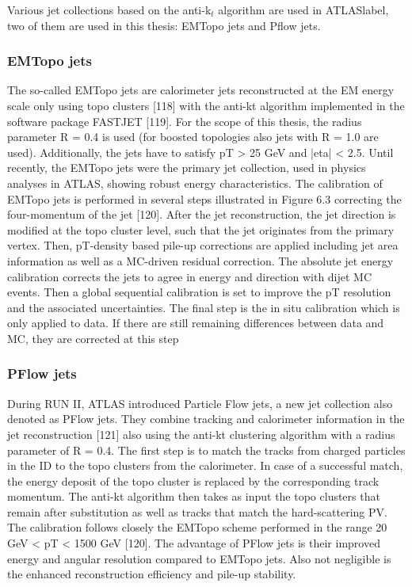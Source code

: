 Various jet collections based on the anti-k$_t$ algorithm are used in \acrshort{ATLASlabel}, two of them are used in this thesis: EMTopo jets and Pflow jets.

\subsubsection{EMTopo jets}

The so-called EMTopo jets are calorimeter jets reconstructed at the EM energy scale only using topo
clusters [118] with the anti-kt algorithm implemented in the software package FASTJET [119]. For
the scope of this thesis, the radius parameter R = 0.4 is used (for boosted topologies also jets with
R = 1.0 are used). Additionally, the jets have to satisfy pT > 25 GeV and |eta| < 2.5. Until recently,
the EMTopo jets were the primary jet collection, used in physics analyses in ATLAS, showing robust
energy characteristics.
The calibration of EMTopo jets is performed in several steps illustrated in Figure 6.3 correcting the
four-momentum of the jet [120]. After the jet reconstruction, the jet direction is modified at the topo
cluster level, such that the jet originates from the primary vertex. Then, pT-density based pile-up corrections are applied including jet area information as well as a MC-driven residual correction.
The absolute jet energy calibration corrects the jets to agree in energy and direction with dijet MC
events. Then a global sequential calibration is set to improve the pT resolution and the associated
uncertainties. The final step is the in situ calibration which is only applied to data. If there are still
remaining differences between data and MC, they are corrected at this step

\subsubsection{PFlow jets}

During RUN II, ATLAS introduced Particle Flow jets, a new jet collection also denoted as PFlow
jets. They combine tracking and calorimeter information in the jet reconstruction [121] also using
the anti-kt clustering algorithm with a radius parameter of R = 0.4.
The first step is to match the tracks from charged particles in the ID to the topo clusters from the
calorimeter. In case of a successful match, the energy deposit of the topo cluster is replaced by the
corresponding track momentum. The anti-kt algorithm then takes as input the topo clusters that
remain after substitution as well as tracks that match the hard-scattering PV. The calibration follows
closely the EMTopo scheme performed in the range 20 GeV < pT < 1500 GeV [120].
The advantage of PFlow jets is their improved energy and angular resolution compared to EMTopo
jets. Also not negligible is the enhanced reconstruction efficiency and pile-up stability.


